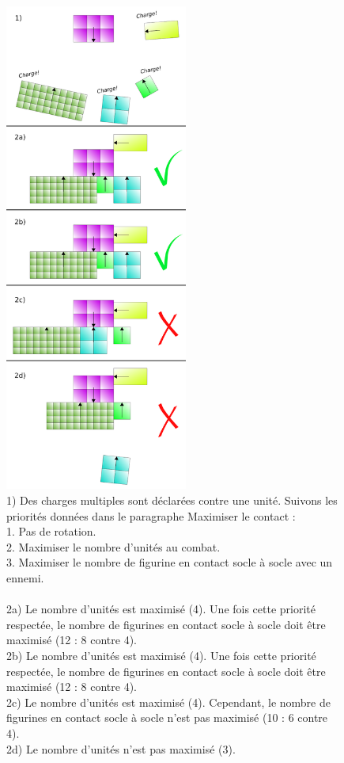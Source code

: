 \begin{figure}[!htbp]
\centering
\includegraphics[width=6cm]{charges_multiples.png}
\caption{1) Des charges multiples sont déclarées contre une unité. Suivons les priorités données dans le paragraphe Maximiser le contact :\\
1. Pas de rotation.\\
2. Maximiser le nombre d'unités au combat.\\
3. Maximiser le nombre de figurine en contact socle à socle avec un ennemi.\\
\\
2a) Le nombre d'unités est maximisé (4). Une fois cette priorité respectée, le nombre de figurines en contact socle à socle doit être maximisé (12 : 8 contre 4). \\
2b) Le nombre d'unités est maximisé (4). Une fois cette priorité respectée, le nombre de figurines en contact socle à socle doit être maximisé (12 : 8 contre 4). \\
2c) Le nombre d'unités est maximisé (4). Cependant, le nombre de figurines en contact socle à socle n'est pas maximisé (10 : 6 contre 4). \\
2d) Le nombre d'unités n'est pas maximisé (3).}
\label{figure/charges_multiples}
\end{figure}

